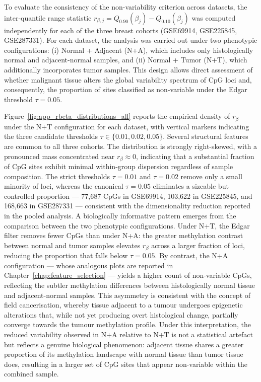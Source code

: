 To evaluate the consistency of the non-variability criterion across datasets, 
the inter-quantile range statistic 
$r_{\beta,j} = Q_{0.90}(\beta_j) - Q_{0.10}(\beta_j)$ 
was computed independently for each of the three breast cohorts 
(GSE69914, GSE225845, GSE287331). For each dataset, the analysis was 
carried out under two phenotypic configurations: 
(i) Normal + Adjacent (N+A), which includes only histologically normal 
and adjacent-normal samples, and (ii) Normal + Tumor (N+T), which 
additionally incorporates tumor samples. This design allows direct 
assessment of whether malignant tissue alters the global variability 
spectrum of CpG loci and, consequently, the proportion of sites 
classified as non-variable under the Edgar threshold 
$\tau = 0.05$.

Figure~\ref{fig:app_rbeta_distributions_all} reports the empirical density 
of $r_{\beta}$ under the N+T configuration for each dataset, with 
vertical markers indicating the three candidate thresholds 
$\tau \in \{0.01, 0.02, 0.05\}$. Several structural features are common 
to all three cohorts. The distribution is strongly right-skewed, with 
a pronounced mass concentrated near $r_{\beta} \approx 0$, indicating 
that a substantial fraction of CpG sites exhibit minimal within-group 
dispersion regardless of sample composition. The strict thresholds 
$\tau = 0.01$ and $\tau = 0.02$ remove only a small minority of loci, 
whereas the canonical $\tau = 0.05$ eliminates a sizeable but controlled 
proportion — 77,687 CpGs in GSE69914, 103,622 in GSE225845, and 
168,663 in GSE287331 — consistent with the dimensionality reduction 
reported in the pooled analysis.
A biologically informative pattern emerges from the comparison between 
the two phenotypic configurations. Under N+T, the Edgar filter removes 
fewer CpGs than under N+A: the greater methylation contrast between 
normal and tumor samples elevates $r_{\beta}$ across a larger fraction 
of loci, reducing the proportion that falls below $\tau = 0.05$. By 
contrast, the N+A configuration — whose analogous plots are reported in 
Chapter~\ref{chap:feature_selection} — yields a higher count of 
non-variable CpGs, reflecting the subtler methylation differences between 
histologically normal tissue and adjacent-normal samples. This asymmetry 
is consistent with the concept of field cancerisation, whereby tissue 
adjacent to a tumour undergoes epigenetic alterations that, while not yet 
producing overt histological change, partially converge towards the tumour 
methylation profile. Under this interpretation, the reduced variability 
observed in N+A relative to N+T is not a statistical artefact but reflects 
a genuine biological phenomenon: adjacent tissue shares a greater proportion 
of its methylation landscape with normal tissue than tumor tissue does, 
resulting in a larger set of CpG sites that appear non-variable within the 
combined sample.

